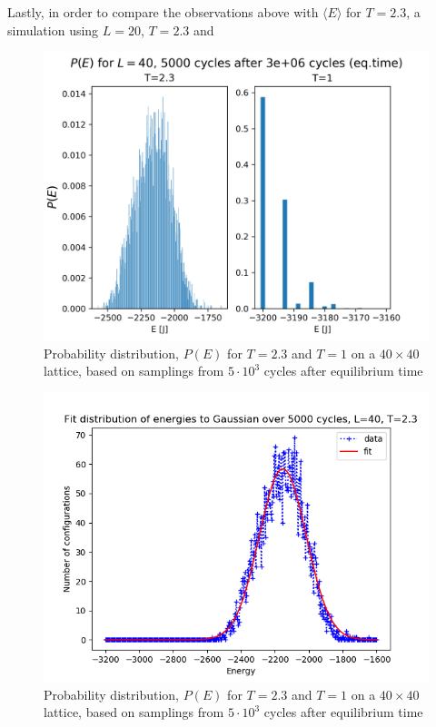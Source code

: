 \documentclass[%
oneside,                 %
final,                   %
10pt]{article}
\begin{document}
Lastly, in order to compare the observations above with $\langle E \rangle$ for $T=2.3$, a simulation using $L=20$, $T=2.3$ and 

\begin{figure}[!htb]
        \centering 
         \includegraphics[scale=.7]{../Results/P(E).png} 
        \caption{Probability distribution, $P(E)$ for $T=2.3$ and $T=1$ on a $40 \times 40$ lattice, based on samplings from $5 \cdot 10^3$ cycles after equilibrium time}
        \label{fig:VAR.normalized}   
\end{figure} 


\begin{figure}[!htb]
        \centering 
         \includegraphics[scale=.7]{../Results/e_var_fit.png} 
        \caption{Probability distribution, $P(E)$ for $T=2.3$ and $T=1$ on a $40 \times 40$ lattice, based on samplings from $5 \cdot 10^3$ cycles after equilibrium time}
        \label{fig:VAR.fit}   
\end{figure}
\end{document}
